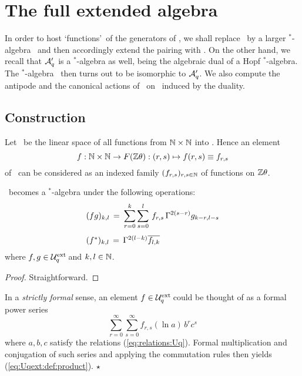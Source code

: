 

\section{The full extended algebra \protect\Uqext}


\begin{abs_chp*}
  In order to host \lq functions\rq\ of the generators of \Uq, we shall
  replace \Uq\ by a larger $^*$-algebra \Uqext\ and then
  accordingly extend the pairing with \Aq\@.
  On the other hand, we recall that ${\mathcal A}_q'$ is a $^*$-algebra as well,
  being the algebraic dual of a Hopf $^*$-algebra.
  The $^*$-algebra \Uqext\ then turns out to be isomorphic to ${\mathcal A}_q'$.
  We also compute the antipode and the canonical actions of \Aq\ on \Uqext\
  induced by the duality.
\end{abs_chp*}


\subsection{Construction}
\begin{defn}
Let \Uqext\ be the linear space of all functions from $\mathbb{N} \times \mathbb{N}$ into \FZ\@.
Hence an element
$$  f : \mathbb{N} \times \mathbb{N} \rightarrow F(\mathbb{Z} \theta) : (r,s) \mapsto f(r,s) \equiv f_{r,s}  $$
of \Uqext\ can be considered as an indexed family $(f_{r,s})_{r,s \in \mathbb{N}}$
of functions on $\mathbb{Z} \theta$.
\end{defn}


\begin{prop} \hspace{3pt}
\Uqext\ becomes a $^*$-algebra under the following operations:
\begin{equation}\label{eq:Uqext:def:product}
 \begin{array}{l} \displaystyle
  (fg)_{k,l}\, = \: \sum_{r=0}^k \sum_{s=0}^l
                       \, f_{r,s} \,\Gamma^{2(s-r)} g_{k-r,l-s}  \\
    \vertXXL
  (f^*)_{k,l}\, = \,\Gamma^{2(l-k)} \overline{f_{l,k}}
 \end{array}
\end{equation}
where\/ $f,g \in{\mathcal U}_q^{\rm ext}\!$ and\/ $k,l \in \mathbb{N}$.
\end{prop}
\begin{proof}
Straightforward.
\end{proof}


\begin{remark} \label{rem:formal_power_series} \rm
  In a {\em strictly formal\/} sense, an element $f\in{\mathcal U}_q^{\rm ext}\!$ could be thought
  of as a formal power series
  $$ \sum_{r=0}^{\infty} \sum_{s=0}^{\infty} f_{r,s}(\ln a)\, b^r c^s $$
  where $a,b,c$ satisfy the relations (\ref{eq:relations:Uq}).
  Formal multiplication and conjugation of such series and applying the commutation rules
  then yields (\ref{eq:Uqext:def:product}).
  \hfill $\star$
\end{remark}


